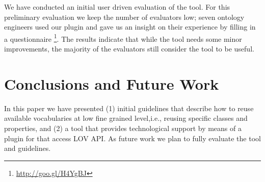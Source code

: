 We have conducted an initial user driven evaluation of the tool. For this preliminary evaluation we keep the number of evaluators low; seven ontology engineers used our plugin and gave us an insight on their experience by filling in a questionnaire \footnote{\url{http://goo.gl/H4YgBJ}}. The results indicate that while the tool needs some minor improvements, the majority of the evaluators still consider the tool to be useful.

\vspace{-3mm}
\section{Conclusions and Future Work}\label{sec:conclusions}
In this paper we have presented (1) initial guidelines that describe how to reuse available vocabularies at low fine grained level,i.e., reusing specific classes and properties, and (2) a tool that provides technological support by means of a plugin for \protege that access LOV API. As future work we plan to fully evaluate the tool and guidelines.


